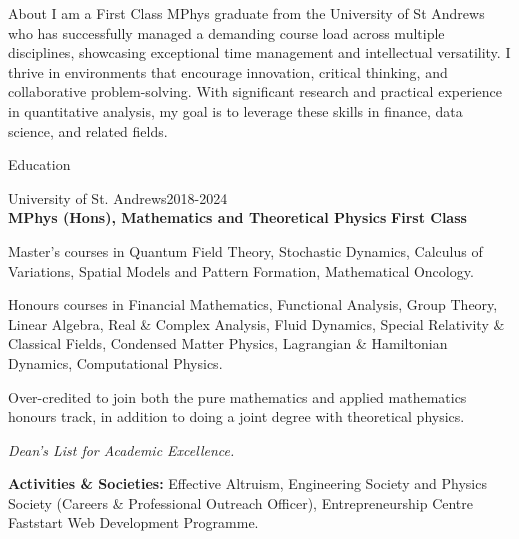 \documentclass{resume} %
\begin{document}
\begin{rSection}{About}
I am a First Class MPhys graduate from the University of St Andrews who has successfully managed a demanding course load across multiple disciplines, showcasing exceptional time management and intellectual versatility. I thrive in environments that encourage innovation, critical thinking, and collaborative problem-solving. With significant research and practical experience in quantitative analysis, my goal is to leverage these skills in finance, data science, and related fields.
\end{rSection}

\begin{rSection}{Education}

\begin{rSubsection}{University of St. Andrews}{2018-2024}{}
\\ {\bf MPhys (Hons), Mathematics and Theoretical Physics} {\bf First Class}

\item{Master's courses in Quantum Field Theory, Stochastic Dynamics, Calculus of Variations, Spatial Models and Pattern Formation, Mathematical Oncology.}

\item{Honours courses in Financial Mathematics, Functional Analysis, Group Theory, Linear Algebra, Real \& Complex Analysis, Fluid Dynamics, Special Relativity \& Classical Fields, Condensed Matter Physics, Lagrangian \& Hamiltonian Dynamics, Computational Physics.}

\item{Over-credited to join both the pure mathematics and applied mathematics honours track, in addition to doing a joint degree with theoretical physics.} 
\item{\textit{Dean's List for Academic Excellence.}}

\setlength{\leftskip}{0.5cm}
\item{\bf Activities \& Societies:} Effective Altruism, Engineering Society and Physics Society (Careers \& Professional Outreach Officer), Entrepreneurship Centre Faststart Web Development Programme. %


\end{rSubsection}
\end{rSection}
\end{document}

